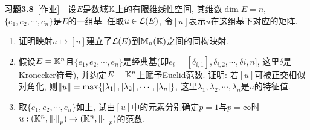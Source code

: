 	\textbf{习题3.8}\ [作业]\ \ 设$ E $是数域$ \mathbb{K} $上的有限维线性空间, 其维数$ \dim E=n $, $ \{ e_1,e_2,\cdots,e_n \} $是$ E $的一组基. 任取$ u\in\mathcal{L}(E) $, 令$ [u] $表示$ u $在这组基下对应的矩阵.
	\begin{enumerate}[(1)]
	\item 证明映射$ u\mapsto[u] $建立了$ \mathcal{L}(E) $到$ \mathbb{M}_n(\mathbb{K}) $之间的同构映射.
	\item 假设$ E=\mathbb{K}^n $且$ \{ e_1,e_2,\cdots,e_n \} $是经典基(即$ e_i=[\delta_{i,1}],\delta_{i,2},\cdots,\delta{i,n}] $, 这里$ \delta $是Kronecker符号), 并约定$ E=\mathbb{K}^n $上赋予Euclid范数. 证明: 若$ [u] $可被正交相似对角化, 则$ \left\| u \right\|=\max\{ \left| \lambda_1 \right| ,\left| \lambda_2 \right| ,\cdots,\left| \lambda_n \right|  \} $, 这里$ \lambda_1,\lambda_2,\cdots,\lambda_n $是$ u $的特征值.
	\item 取$ \{ e_1,e_2,\cdots,e_n \} $如上, 试由$ [u] $中的元素分别确定$ p=1 $与$ p=\infty $时$ u : (\mathbb{K}^n,\left\| \cdot \right\|_p)\to(\mathbb{K}^n,\left\| \cdot \right\|_p) $的范数.
	\end{enumerate}
